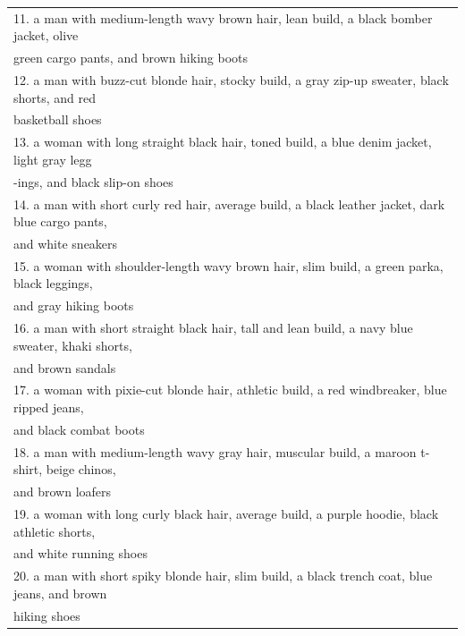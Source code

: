 \begin{table}[!ht]
\begin{threeparttable}
{\begin{tabular}{l}
11. a man with medium-length wavy brown hair, lean build, a black bomber jacket, olive \\ \quad green cargo pants, and brown hiking boots \\
12. a man with buzz-cut blonde hair, stocky build, a gray zip-up sweater, black shorts, and red \\ \quad basketball shoes \\
13. a woman with long straight black hair, toned build, a blue denim jacket, light gray legg\\ \quad -ings, and black slip-on shoes \\
14. a man with short curly red hair, average build, a black leather jacket, dark blue cargo pants, \\ \quad and white sneakers \\
15. a woman with shoulder-length wavy brown hair, slim build, a green parka, black leggings, \\ \quad and gray hiking boots \\
16. a man with short straight black hair, tall and lean build, a navy blue sweater, khaki shorts, \\ \quad and brown sandals \\
17. a woman with pixie-cut blonde hair, athletic build, a red windbreaker, blue ripped jeans, \\ \quad and black combat boots \\
18. a man with medium-length wavy gray hair, muscular build, a maroon t-shirt, beige chinos, \\ \quad and brown loafers \\
19. a woman with long curly black hair, average build, a purple hoodie, black athletic shorts, \\ \quad and white running shoes \\
20. a man with short spiky blonde hair, slim build, a black trench coat, blue jeans, and brown \\ \quad hiking shoes \\

\bottomrule

\end{tabular}
}

\end{threeparttable}
\end{table}
